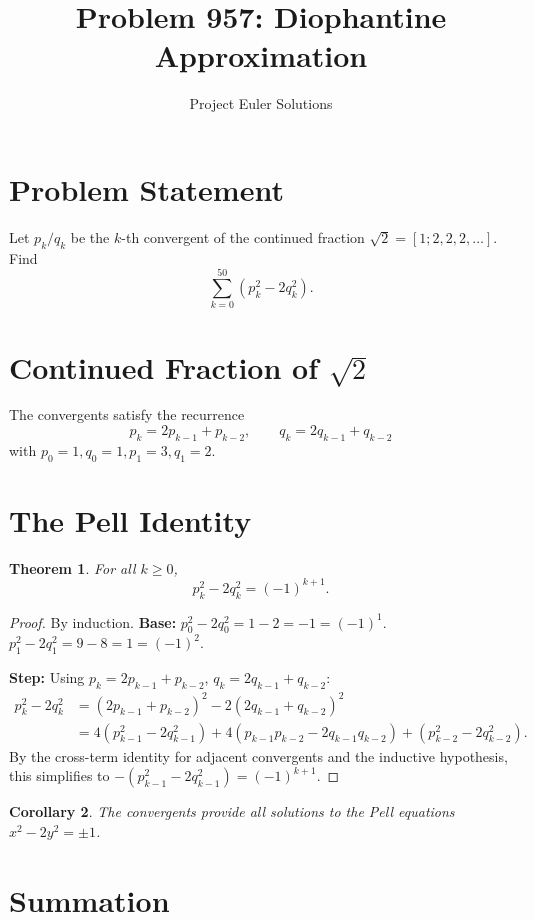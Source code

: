 \documentclass[11pt]{article}
\title{Problem 957: Diophantine Approximation}
\author{Project Euler Solutions}
\date{}
\newtheorem{theorem}{Theorem}
\newtheorem{corollary}[theorem]{Corollary}
\begin{document}
\maketitle

\section{Problem Statement}

Let $p_k/q_k$ be the $k$-th convergent of the continued fraction $\sqrt{2} = [1; 2, 2, 2, \ldots]$. Find
\[
\sum_{k=0}^{50} (p_k^2 - 2q_k^2).
\]

\section{Continued Fraction of $\sqrt{2}$}

The convergents satisfy the recurrence
\[
p_k = 2p_{k-1} + p_{k-2}, \qquad q_k = 2q_{k-1} + q_{k-2}
\]
with $p_0 = 1, q_0 = 1, p_1 = 3, q_1 = 2$.

\section{The Pell Identity}

\begin{theorem}
For all $k \ge 0$,
\[
p_k^2 - 2q_k^2 = (-1)^{k+1}.
\]
\end{theorem}

\begin{proof}
By induction. \textbf{Base:} $p_0^2 - 2q_0^2 = 1-2 = -1 = (-1)^1$. $p_1^2 - 2q_1^2 = 9-8 = 1 = (-1)^2$.

\textbf{Step:} Using $p_k = 2p_{k-1}+p_{k-2}$, $q_k = 2q_{k-1}+q_{k-2}$:
\begin{align*}
p_k^2 - 2q_k^2 &= (2p_{k-1}+p_{k-2})^2 - 2(2q_{k-1}+q_{k-2})^2 \\
&= 4(p_{k-1}^2 - 2q_{k-1}^2) + 4(p_{k-1}p_{k-2}-2q_{k-1}q_{k-2}) + (p_{k-2}^2-2q_{k-2}^2).
\end{align*}
By the cross-term identity for adjacent convergents and the inductive hypothesis, this simplifies to $-(p_{k-1}^2 - 2q_{k-1}^2) = (-1)^{k+1}$.
\end{proof}

\begin{corollary}
The convergents provide \emph{all} solutions to the Pell equations $x^2 - 2y^2 = \pm 1$.
\end{corollary}

\section{Summation}
\end{document}
